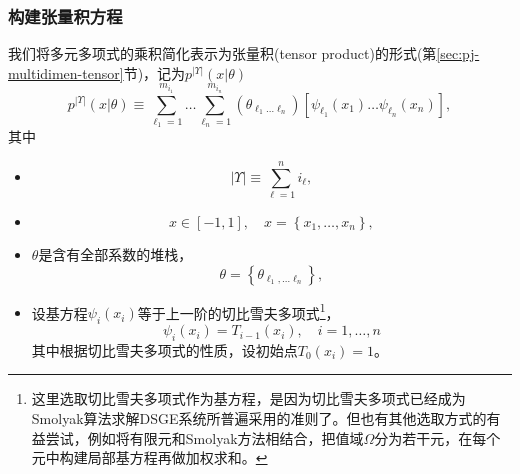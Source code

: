 \subsubsection{构建张量积方程}
\label{sec:pj-sparsity-tensor-product}
我们将多元多项式的乘积简化表示为张量积(tensor product)的形式(第\ref{sec:pj-multidimen-tensor}节)，记为$p^{\left| \Upsilon \right|} \left( x | \theta \right)$
\begin{equation*}
  p^{\left| \Upsilon \right|} \left( x | \theta \right)
  \equiv
  \sum_{\ell_{1} =1}^{m_{i_{1}}} \ldots \sum_{\ell_{n}=1}^{m_{i_{n}}}
  \left( \theta_{\ell_{1} \ldots \ell_{n}} \right)
  \left[
  \psi_{\ell_{1}} \left( x_{1} \right)
  \ldots \psi_{\ell_{n}} \left( x_{n} \right)
  \right],
\end{equation*}
其中
\begin{itemize}
  \item \begin{equation*}
  \left| \Upsilon \right| \equiv \sum_{\ell=1}^{n} i_{\ell},
  \end{equation*}
  \item \begin{equation*}
  x \in [-1,1], \quad x = \left\{ x_{1}, \ldots, x_{n} \right\},
  \end{equation*}
  \item $\theta$是含有全部系数的堆栈，
  \begin{equation*}
    \theta = \left\{ \theta_{\ell_{1}, \ldots \ell_{n}} \right\},
  \end{equation*}
  \item 设基方程$\psi_{i} \left( x_{i} \right)$等于上一阶的切比雪夫多项式\footnote{这里选取切比雪夫多项式作为基方程，是因为切比雪夫多项式已经成为Smolyak算法求解DSGE系统所普遍采用的准则了。但也有其他选取方式的有益尝试，例如\cite{Nobile:2008kv}将有限元和Smolyak方法相结合，把值域$\Omega$分为若干元，在每个元中构建局部基方程再做加权求和。}，
  \begin{equation*}
    \psi_{i} \left( x_{i} \right) = T_{i-1} \left( x_{i} \right), \quad i=1,\ldots,n
  \end{equation*}
  其中根据切比雪夫多项式的性质，设初始点$T_{0}(x_{i}) =1$。
\end{itemize}

